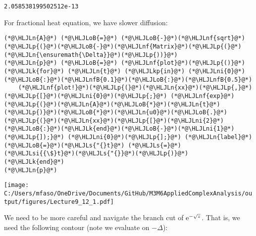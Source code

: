 \documentclass[12pt,landscape]{article}
\newcommand{\HLJLk}[1]{\textcolor[RGB]{148,91,176}{\textbf{#1}}}
\newcommand{\HLJLkp}[1]{\textcolor[RGB]{148,91,176}{\textbf{#1}}}
\newcommand{\HLJLn}[1]{#1}
\newcommand{\HLJLnf}[1]{\textcolor[RGB]{66,102,213}{#1}}
\newcommand{\HLJLs}[1]{\textcolor[RGB]{201,61,57}{#1}}
\newcommand{\HLJLsi}[1]{#1}
\newcommand{\HLJLnfB}[1]{\textcolor[RGB]{59,151,46}{#1}}
\newcommand{\HLJLni}[1]{\textcolor[RGB]{59,151,46}{#1}}
\newcommand{\HLJLoB}[1]{\textcolor[RGB]{102,102,102}{\textbf{#1}}}
\newcommand{\HLJLp}[1]{#1}
\def\E{ {\rm e} }
\def\cent#1{\begin{center}#1\end{center} }
\begin{document}
{\begin{lstlisting}
2.058538199502512e-13
\end{lstlisting}

\newpage
For fractional heat equation, we have slower diffusion:


\begin{lstlisting}
(*@\HLJLn{A}@*) (*@\HLJLoB{=}@*) (*@\HLJLoB{-}@*)(*@\HLJLnf{sqrt}@*)(*@\HLJLp{(}@*)(*@\HLJLoB{-}@*)(*@\HLJLnf{Matrix}@*)(*@\HLJLp{(}@*)(*@\HLJLn{\ensuremath{\Delta}}@*)(*@\HLJLp{))}@*)
(*@\HLJLn{p}@*) (*@\HLJLoB{=}@*) (*@\HLJLnf{plot}@*)(*@\HLJLp{()}@*)
(*@\HLJLk{for}@*) (*@\HLJLn{t}@*) (*@\HLJLkp{in}@*) (*@\HLJLni{0}@*)(*@\HLJLoB{:}@*)(*@\HLJLnfB{0.1}@*)(*@\HLJLoB{:}@*)(*@\HLJLnfB{0.5}@*)
    (*@\HLJLnf{plot!}@*)(*@\HLJLp{(}@*)(*@\HLJLn{xx}@*)(*@\HLJLp{,}@*) (*@\HLJLp{[}@*)(*@\HLJLni{0}@*)(*@\HLJLp{;}@*) (*@\HLJLnf{exp}@*)(*@\HLJLp{(}@*)(*@\HLJLn{A}@*)(*@\HLJLoB{*}@*)(*@\HLJLn{t}@*)(*@\HLJLp{)}@*)(*@\HLJLoB{*}@*)(*@\HLJLn{u0}@*)(*@\HLJLoB{.}@*)(*@\HLJLp{(}@*)(*@\HLJLn{xx}@*)(*@\HLJLp{[}@*)(*@\HLJLni{2}@*)(*@\HLJLoB{:}@*)(*@\HLJLk{end}@*)(*@\HLJLoB{-}@*)(*@\HLJLni{1}@*)(*@\HLJLp{]);}@*) (*@\HLJLni{0}@*)(*@\HLJLp{];}@*) (*@\HLJLn{label}@*)(*@\HLJLoB{=}@*)(*@\HLJLs{"{}t}@*) (*@\HLJLs{=}@*) (*@\HLJLsi{{\$}t}@*)(*@\HLJLs{"{}}@*)(*@\HLJLp{)}@*)
(*@\HLJLk{end}@*)
(*@\HLJLn{p}@*)
\end{lstlisting}

\cent{\texttt{[image: C:/Users/mfaso/OneDrive/Documents/GitHub/M3M6AppliedComplexAnalysis/output/figures/Lecture9\_12\_1.pdf]}}

We need to be more careful and navigate the branch cut of $\E^{-\sqrt{z}}$. That is, we need the following contour (note we evaluate on $-\Delta$):


}
\end{document}
